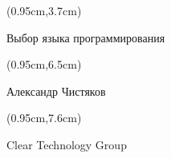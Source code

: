 \documentclass[xetex,18pt,aspectratio=43]{beamer}
\title[Выбор языка программирования]{}
\author[Александр Чистяков, ClearTech]{}
\date{}
\newcommand\Bigfont{\fontsize{20}{20}\selectfont}
\newcommand\Authorfont{\fontsize{17}{17}\selectfont}
\newcommand\Orgfont{\fontsize{13}{13}\selectfont}
\begin{document}
{ %
    \begin{frame}[plain]
      \begin{textblock*}{\framewidth}(0.95cm,3.7cm) %
        \Bigfont
          \begin{center}
          Выбор языка программирования
          \end{center}
      \end{textblock*}
      \begin{textblock*}{\framewidth}(0.95cm,6.5cm) %
        \Authorfont
          \begin{center}
          Александр Чистяков
          \end{center}
      \end{textblock*}
      \begin{textblock*}{\framewidth}(0.95cm,7.6cm) %
        \Orgfont
          \begin{center}
          Clear Technology Group
          \end{center}
      \end{textblock*}
     \end{frame}
}
\end{document}
